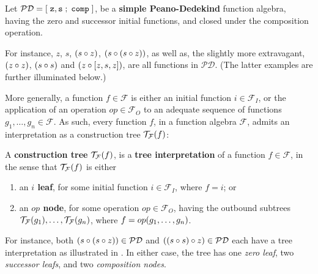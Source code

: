 \begin{definition} \label{def:function-algebra-p} Let $\mathcal{PD} =
\mathopen{}\left[{\mathrel{}\mathtt{z}, \mathtt{s}\mathrel{};\mathrel{}\mathtt{comp}\mathrel{}}\right]\mathclose{}$, be a \textbf{simple
Peano-Dedekind} function algebra, having the zero and successor initial
functions, and closed under the composition operation.\end{definition}

For instance, $z$, $s$, ${\mathopen{}\left({s \circ z}\right)\mathclose{}}$, ${\mathopen{}\left({s \circ {\ensuremath{\mathopen{}\left({s \circ z}\right)\mathclose{}}}}\right)\mathclose{}}$, as well
as, the slightly more extravagant, ${\mathopen{}\left({z \circ z}\right)\mathclose{}}$, ${\mathopen{}\left({s \circ s}\right)\mathclose{}}$ and ${\mathopen{}\left({z
\circ \mathopen{}\left[{z, s, z}\right]\mathclose{}}\right)\mathclose{}}$, are all functions in $\mathcal{PD}$. (The latter
examples are further illuminated below.)

More generally, a function $f \in \mathcal{F}$ is either an initial function $i
\in \mathcal{F}_I$, or the application of an operation $op \in \mathcal{F}_O$
to an adequate sequence of functions $g_1, \ldots, g_n \in \mathcal{F}$.  As
such, every function $f$, in a function algebra $\mathcal{F}$, admits an
interpretation as a construction tree $\mathcal{T}_\mathcal{F}{\mathopen{}\left({f}\right)\mathclose{}}$:

\begin{definition} \label{def:construction-tree} A \textbf{construction tree}
$\mathcal{T}_\mathcal{F}{\mathopen{}\left({f}\right)\mathclose{}}$, is a \textbf{tree interpretation} of a function
$f \in \mathcal{F}$, in the sense that $\mathcal{T}_\mathcal{F}{\mathopen{}\left({f}\right)\mathclose{}}$ is either

\begin{enumerate}[label=(\arabic*)]

\item an \textbf{$i$ leaf}, for some initial function $i \in \mathcal{F}_I$, where $f =
i$; or

\item an \textbf{$op$ node}, for some operation $op \in \mathcal{F}_O$, having
the outbound subtrees $\mathcal{T}_\mathcal{F}{\mathopen{}\left({g_1}\right)\mathclose{}}, \ldots,
\mathcal{T}_\mathcal{F}{\mathopen{}\left({g_n}\right)\mathclose{}}$, where $f = op{\mathopen{}\left({g_1, \ldots, g_n}\right)\mathclose{}}$.

\end{enumerate}

\end{definition}

For instance, both ${\mathopen{}\left({s \circ {\ensuremath{\mathopen{}\left({s \circ z}\right)\mathclose{}}}}\right)\mathclose{}} \in \mathcal{PD}$ and ${\mathopen{}\left({{\mathopen{}\left({s
\circ s}\right)\mathclose{}} \circ z}\right)\mathclose{}} \in \mathcal{PD}$ each have a tree interpretation as
illustrated in . In either case, the tree has one
\emph{zero leaf}, two \emph{successor leafs}, and two \emph{composition nodes}.

